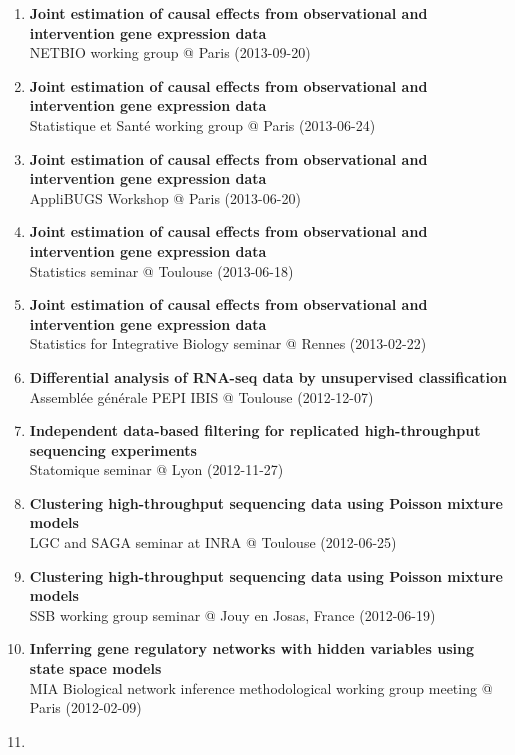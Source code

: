 \documentclass[11pt, a4paper]{awesome-cv}
\begin{document}
\begin{enumerate}
{  analysis of RNA-seq data}\\
  Statistics for Integrative Biology (SIB) seminar @ Rennes (2013-10-29)
\item
  \textbf{Joint estimation of causal effects from observational and
  intervention gene expression data}\\
  NETBIO working group @ Paris (2013-09-20)
\item
  \textbf{Joint estimation of causal effects from observational and
  intervention gene expression data}\\
  Statistique et Santé working group @ Paris (2013-06-24)
\item
  \textbf{Joint estimation of causal effects from observational and
  intervention gene expression data}\\
  AppliBUGS Workshop @ Paris (2013-06-20)
\item
  \textbf{Joint estimation of causal effects from observational and
  intervention gene expression data}\\
  Statistics seminar @ Toulouse (2013-06-18)
\item
  \textbf{Joint estimation of causal effects from observational and
  intervention gene expression data}\\
  Statistics for Integrative Biology seminar @ Rennes (2013-02-22)
\item
  \textbf{Differential analysis of RNA-seq data by unsupervised
  classification}\\
  Assemblée générale PEPI IBIS @ Toulouse (2012-12-07)
\item
  \textbf{Independent data-based filtering for replicated
  high-throughput sequencing experiments}\\
  Statomique seminar @ Lyon (2012-11-27)
\item
  \textbf{Clustering high-throughput sequencing data using Poisson
  mixture models}\\
  LGC and SAGA seminar at INRA @ Toulouse (2012-06-25)
\item
  \textbf{Clustering high-throughput sequencing data using Poisson
  mixture models}\\
  SSB working group seminar @ Jouy en Josas, France (2012-06-19)
\item
  \textbf{Inferring gene regulatory networks with hidden variables using
  state space models}\\
  MIA Biological network inference methodological working group meeting
  @ Paris (2012-02-09)
\item

\end{enumerate}
\end{document}
